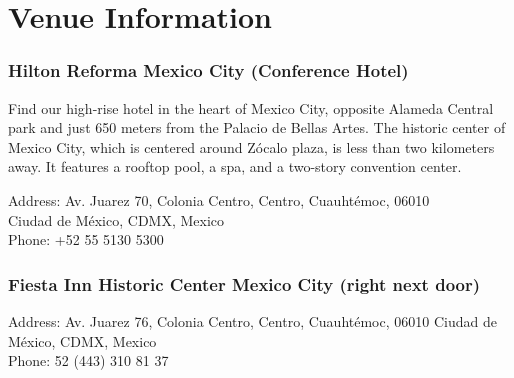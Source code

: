 \chapter{Venue Information}

\subsection*{Hilton Reforma Mexico City (Conference Hotel)}
Find our high-rise hotel in the heart of Mexico City, opposite Alameda Central park and just 650 meters from the Palacio de Bellas Artes. 
The historic center of Mexico City, which is centered around Z\'ocalo plaza, is less than two kilometers away. 
It features a rooftop pool, a spa, and a two-story convention center.

Address: Av. Juarez 70, Colonia Centro, Centro, Cuauhtémoc, 06010 \\
Ciudad de México, CDMX, Mexico \\
Phone: +52 55 5130 5300 \\

\subsection*{Fiesta Inn Historic Center Mexico City (right next door)}
Address: Av. Juarez 76, Colonia Centro, Centro, Cuauhtémoc, 06010 Ciudad de México, CDMX, Mexico \\
Phone: 52 (443) 310 81 37
